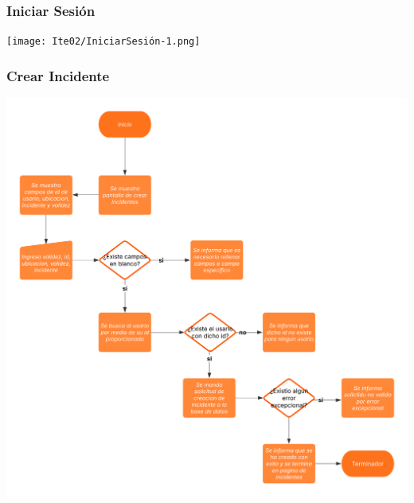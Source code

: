 \newpage
\subsubsection*{Iniciar Sesión}
\begin{center}
    \texttt{[image: Ite02/IniciarSesión-1.png]}
\end{center}

\newpage
\subsubsection*{Crear Incidente}
\begin{center}
    \includegraphics[scale = .9]{Ite02/CrearIncidente-1.png}
\end{center}

\newpage
